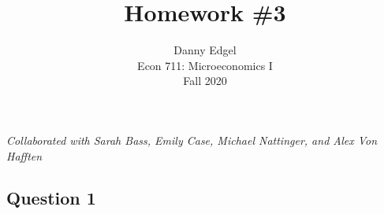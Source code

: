 \documentclass{article}
\begin{document}
\title{	Homework \#3 }
\author{ 	Danny Edgel 					\\ 
			Econ 711: Microeconomics I		\\
			Fall 2020						\\
		}
\maketitle\thispagestyle{empty}

\noindent\textit{Collaborated with Sarah Bass, Emily Case, Michael Nattinger, and Alex Von Hafften}


\subsection*{Question 1}
\end{document}
